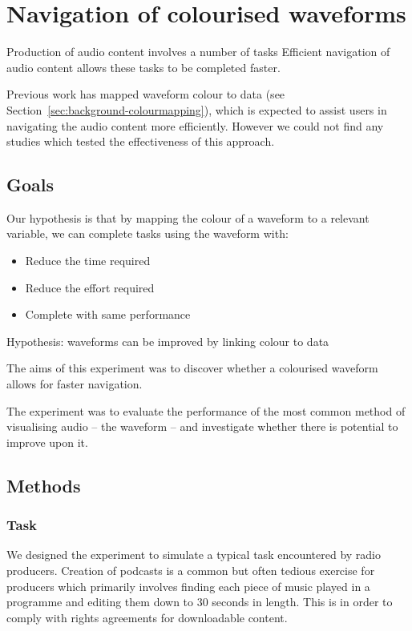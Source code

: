 \chapter{Navigation of colourised waveforms}\label{chp:colourised}

Production of audio content involves a number of tasks
Efficient navigation of audio content allows these tasks to be completed faster.

Previous work has mapped waveform colour to data (see Section~\ref{sec:background-colourmapping}), which is expected to
assist users in navigating the audio content more efficiently. However we could not find any studies which tested the
effectiveness of this approach.

\section{Goals}

Our hypothesis is that by mapping the colour of a waveform to a relevant variable, we can complete tasks using the
waveform with:
\begin{itemize}
  \item Reduce the time required
  \item Reduce the effort required
  \item Complete with same performance
\end{itemize}

Hypothesis: waveforms can be improved by linking colour to data

The aims of this experiment was to discover whether a colourised waveform allows for faster navigation.

The experiment was to evaluate the performance of the most common method of visualising audio -- the
waveform -- and investigate whether there is potential to improve upon it.

\section{Methods}

\subsection{Task}\label{sec:studytask}
We designed the experiment to simulate a typical task encountered by radio producers. Creation of podcasts is a common
but often tedious exercise for producers which primarily involves finding each piece of music played in a programme and
editing them down to 30 seconds in length. This is in order to comply with rights agreements for downloadable content.

